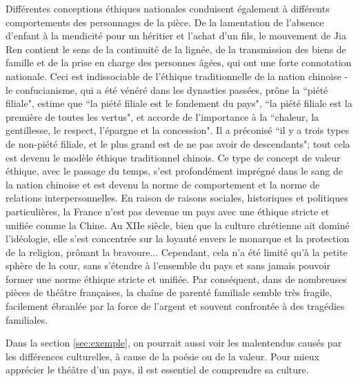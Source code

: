 \documentclass[UTF8,a4paper,12pt]{ctexart}
\numberwithin{equation}{section}
\newcommand{\mycite}[1]{\cite{#1}}
\begin{document}
Différentes conceptions éthiques nationales conduisent également à différents comportements des personnages de la pièce. De la lamentation de l'absence d'enfant à la mendicité pour un héritier et l'achat d'un fils, le mouvement de Jia Ren contient le sens de la continuité de la lignée, de la transmission des biens de famille et de la prise en charge des personnes âgées, qui ont une forte connotation nationale. Ceci est indissociable de l'éthique traditionnelle de la nation chinoise - le confucianisme, qui a été vénéré dans les dynasties passées, prône la ``piété filiale", estime que ``la piété filiale est le fondement du pays", ``la piété filiale est la première de toutes les vertus", et accorde de l'importance à la ``chaleur, la gentillesse, le respect, l'épargne et la concession". Il a préconisé ``il y a trois types de non-piété filiale, et le plus grand est de ne pas avoir de descendants"; tout cela est devenu le modèle éthique traditionnel chinois. Ce type de concept de valeur éthique, avec le passage du temps, s'est profondément imprégné dans le sang de la nation chinoise et est devenu la norme de comportement et la norme de relations interpersonnelles. En raison de raisons sociales, historiques et politiques particulières, la France n'est pas devenue un pays avec une éthique stricte et unifiée comme la Chine. Au XIIe siècle, bien que la culture chrétienne ait dominé l'idéologie, elle s'est concentrée sur la loyauté envers le monarque et la protection de la religion, prônant la bravoure... Cependant, cela n'a été limité qu'à la petite sphère de la cour, sans s'étendre à l'ensemble du pays et sans jamais pouvoir former une norme éthique stricte et unifiée. Par conséquent, dans de nombreuses pièces de théâtre françaises, la chaîne de parenté familiale semble très fragile, facilement ébranlée par la force de l'argent et souvent confrontée à des tragédies familiales\mycite{88}.

Dans la section \ref{sec:exemple}, on pourrait aussi voir les malentendus causés par les différences culturelles, à cause de la poésie ou de la valeur. Pour mieux apprécier le théâtre d'un pays, il est essentiel de comprendre sa culture.
\end{document}
